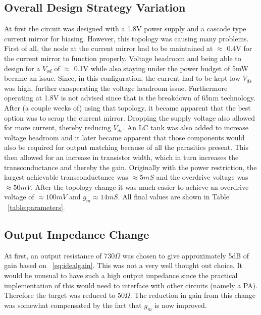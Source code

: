 \documentclass{article}                                                         %
\begin{document}
\subsection{Overall Design Strategy Variation}

At first the circuit was designed with a 1.8V power supply and a cascode type current mirror for biasing.
However, this topology was causing many problems. First of all, the node at the current mirror
had to be maintained at $\approx$ 0.4V for the current mirror to function properly. Voltage headroom and being able to design for a $V_{od}$
of $\approx$ 0.1V while also staying under the power budget of 5mW became an issue. Since, in this configuration,
the current had to be kept low $V_{ds}$ was high, further exasperating the voltage headroom issue. Furthermore operating at
1.8V is not advised since that is the breakdown of 65nm technology.\\

\vspace{3mm}
After (a couple weeks of) using that topology, it became apparent that the best option was to scrap the current mirror. Dropping the
supply voltage also allowed for more current, thereby reducing $V_{ds}$. An LC
tank was also added to increase voltage headroom and it later became apparent that those components would
also be required for output matching because of all the parasitics present.
This then allowed for an increase in transistor width, which in turn increases the transconductance and thereby the gain.
Originally with the power restriction, the largest achievable transconductance was $\approx 5mS$ and the overdrive voltage
was $\approx 50mV$. After the topology change it was much easier to achieve an overdrive voltage of $\approx 100mV$ and $g_m
\approx 14mS$. All final values are shown in Table ~\ref{table:parameters}.\\
\subsection{Output Impedance Change}

At first, an output resistance of 730$\Omega$ was chosen to give approximately 5dB of gain based on ~\ref{eq:idealgain}.
This was not a very well thought out choice. It would be unusual to have such a high output impedance since the practical
implementation of this would need to interface with other circuits (namely a PA). Therefore the target was reduced
to 50$\Omega$. The reduction in gain from this change was somewhat compensated by the fact that $g_m$ is now improved.
\end{document}

